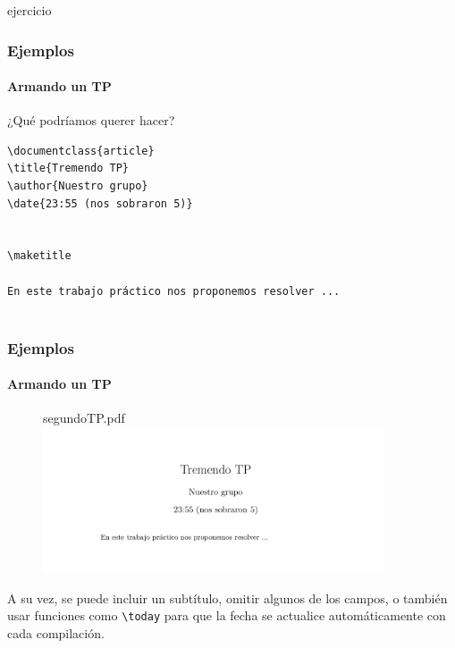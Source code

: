 \begin{frame}{ejercicio}

    
\end{frame}

\begin{frame}[fragile]
\frametitle{Ejemplos}
\framesubtitle{Armando un TP}

¿Qué podríamos querer hacer?

\begin{lstlisting}[title={segundoTP.tex}]
\documentclass{article}
\title{Tremendo TP}
\author{Nuestro grupo}
\date{23:55 (nos sobraron 5)}


\maketitle

En este trabajo práctico nos proponemos resolver ...


\end{lstlisting}

\end{frame}

\begin{frame}
\frametitle{Ejemplos}
\framesubtitle{Armando un TP}

\begin{figure}
segundoTP.pdf
\includegraphics[width=0.9\textwidth]{../images/ejemplo_tp_1.png}
\end{figure}

A su vez, se puede incluir un subtítulo, omitir algunos de los campos, o también usar funciones como \texttt{\textbackslash today} para que la fecha se actualice automáticamente con cada compilación.

\end{frame}


